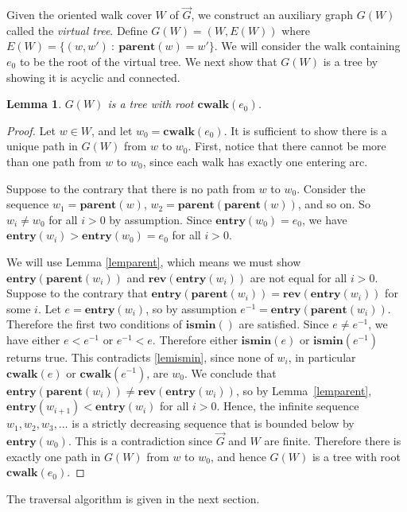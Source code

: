 \documentclass[12pt,letterpaper,oneside]{book}
\newcommand{\rev}{\textbf{rev}}
\newcommand{\cwalk}{\textbf{cwalk}}
\newcommand{\entry}{\textbf{entry}}
\newcommand{\parent}{\textbf{parent}}
\newcommand{\ismin}{\textbf{ismin}}
\newtheorem{lemma}[theorem]{Lemma}
\begin{document}
Given the oriented walk cover $W$ of $\vec{G}$, we construct an auxiliary graph $G(W)$ called the \emph{virtual tree}.  
Define $G(W)=(W,E(W))$ where $E(W) = \{(w,w') \: : \: \parent(w) = w' \}$.  We will consider the walk containing $e_0$ to be the 
root of the virtual tree.    
We next show that $G(W)$ is a tree by showing it is acyclic and connected.  

\begin{lemma}
\label{lemtree}
$G(W)$ is a tree with root $\cwalk(e_0)$. 
\end{lemma}
\begin{proof}

Let $w\in W$, and let $w_0 = \cwalk(e_0)$.  It is sufficient to show there 
is a unique path in $G(W)$ from $w$ to $w_0$.  
First, notice that there cannot be more than one path from 
$w$ to $w_0$, since each walk has exactly one entering arc.  

Suppose to the contrary that there is no path from $w$ to $w_0$.  
Consider the sequence $w_1 = \parent(w)$, $w_2 = \parent(\parent(w))$, and so on.  So $w_i \ne w_0$ for 
all $i>0$ by assumption.  Since $\entry(w_0)=e_0$, we have $\entry(w_i) > \entry(w_0)=e_0$ for all $i>0$.  


We will use Lemma \ref{lemparent}, which means we must show 
$\entry(\parent(w_i))$ and $\rev(\entry(w_i))$ are not equal for all $i>0$.  Suppose to the contrary that \newline
$\entry(\parent(w_i)) = \rev(\entry(w_i))$ for some $i$.  
Let $e=\entry(w_i)$, so by assumption $e^{-1}= \entry(\parent(w_i))$.  Therefore the 
first two conditions of $\ismin()$ are satisfied.  Since $e\ne e^{-1}$, we have either $e<e^{-1}$ or $e^{-1}<e$.  Therefore 
either $\ismin(e)$ or $\ismin(e^{-1})$ returns true.  This contradicts \ref{lemismin}, since none of $w_i$, in particular $\cwalk(e)$ 
or $\cwalk(e^{-1})$, are $w_0$.    
We conclude that $\entry(\parent(w_i)) \ne \rev(\entry(w_i))$, so by Lemma~\ref{lemparent}, 
$\entry(w_{i+1}) < \entry(w_i)$ for all $i>0$.  Hence, the infinite sequence $w_1,w_2,w_3,\ldots$ is 
a strictly decreasing sequence that is bounded below by $\entry(w_0)$.  
This is a contradiction since $\vec{G}$ and $W$ are finite.  Therefore there is exactly one path in $G(W)$ from $w$ to $w_0$, and hence $G(W)$ 
is a tree with root $\cwalk(e_0)$.
\end{proof}

The traversal algorithm is given in the next section. %
\end{document}
